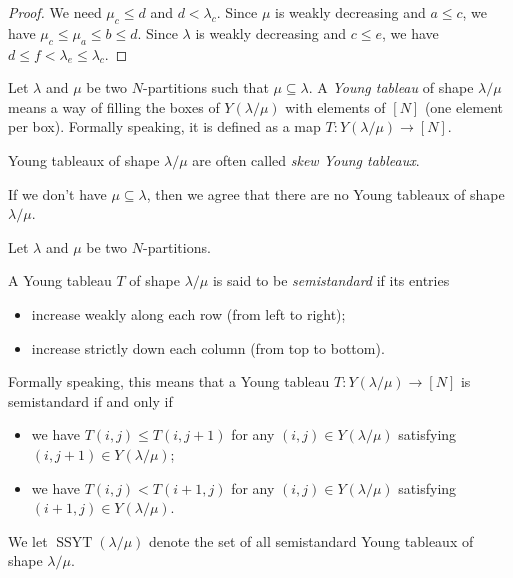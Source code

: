 \begin{proof}
We need $\mu_c \le d$ and $d < \lambda_c$.
Since $\mu$ is weakly decreasing and $a \le c$, we have $\mu_c \le \mu_a \le b \le d$.
Since $\lambda$ is weakly decreasing and $c \le e$, we have
$d \le f < \lambda_e \le \lambda_c$.
\end{proof}

\begin{definition}
\label{def.sf.skew-tab}
\leantarget
\leanok
Let $\lambda$ and $\mu$ be two $N$-partitions such that
$\mu\subseteq\lambda$. A \emph{Young tableau} of shape $\lambda/\mu$ means a
way of filling the boxes of $Y\left(  \lambda/\mu\right)  $ with elements of
$\left[  N\right]  $ (one element per box). Formally speaking, it is defined
as a map $T:Y\left(  \lambda/\mu\right)  \rightarrow\left[  N\right]  $.

Young tableaux of shape $\lambda/\mu$ are often called \emph{skew Young
tableaux}.

If we don't have $\mu\subseteq\lambda$, then we agree that there are no Young
tableaux of shape $\lambda/\mu$.
\end{definition}

\begin{definition}
\label{def.sf.skew-ssyt}
\leantarget
\leanok
Let $\lambda$ and $\mu$ be two $N$-partitions.

A Young tableau $T$ of shape $\lambda/\mu$ is said to be \emph{semistandard}
if its entries

\begin{itemize}
\item increase weakly along each row (from left to right);

\item increase strictly down each column (from top to bottom).
\end{itemize}

Formally speaking, this means that a Young tableau $T:Y\left(  \lambda
/\mu\right)  \rightarrow\left[  N\right]  $ is semistandard if and only if

\begin{itemize}
\item we have $T\left(  i,j\right)  \leq T\left(  i,j+1\right)  $ for any
$\left(  i,j\right)  \in Y\left(  \lambda/\mu\right)  $ satisfying $\left(
i,j+1\right)  \in Y\left(  \lambda/\mu\right)  $;

\item we have $T\left(  i,j\right)  <T\left(  i+1,j\right)  $ for any $\left(
i,j\right)  \in Y\left(  \lambda/\mu\right)  $ satisfying $\left(
i+1,j\right)  \in Y\left(  \lambda/\mu\right)  $.
\end{itemize}

We let $\operatorname*{SSYT}\left(  \lambda/\mu\right)  $ denote the set of
all semistandard Young tableaux of shape $\lambda/\mu$.
\end{definition}

